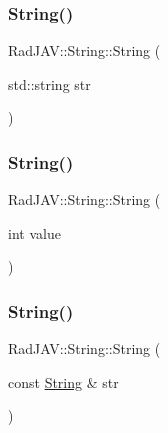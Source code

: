 \subsubsection{\texorpdfstring{String()}{String()}\hspace{0.1cm}{\footnotesize\ttfamily [2/9]}}
{\footnotesize\ttfamily Rad\+J\+A\+V\+::\+String\+::\+String (\begin{DoxyParamCaption}\item[{std\+::string}]{str }\end{DoxyParamCaption})\hspace{0.3cm}{\ttfamily [inline]}}

\mbox{\label{class_rad_j_a_v_1_1_string_ac73be9671464715f5f461b242896ee0e}} 
\subsubsection{\texorpdfstring{String()}{String()}\hspace{0.1cm}{\footnotesize\ttfamily [3/9]}}
{\footnotesize\ttfamily Rad\+J\+A\+V\+::\+String\+::\+String (\begin{DoxyParamCaption}\item[{int}]{value }\end{DoxyParamCaption})\hspace{0.3cm}{\ttfamily [inline]}}

\mbox{\label{class_rad_j_a_v_1_1_string_abdf12af39be1b08362731678b1edbf9c}} 
\subsubsection{\texorpdfstring{String()}{String()}\hspace{0.1cm}{\footnotesize\ttfamily [4/9]}}
{\footnotesize\ttfamily Rad\+J\+A\+V\+::\+String\+::\+String (\begin{DoxyParamCaption}\item[{const \mbox{\hyperlink{class_rad_j_a_v_1_1_string}{String}} \&}]{str }\end{DoxyParamCaption})\hspace{0.3cm}{\ttfamily [inline]}}

